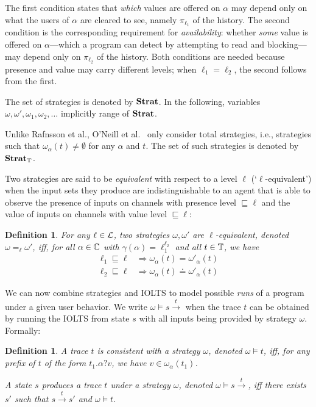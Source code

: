 \documentclass[preprint,5p,twocolumn]{elsarticle}
\newtheorem{definition}[theorem]{Definition}
\begin{document}
The first condition states that \emph{which} values are offered on $\alpha$ may depend only on
what the users of $\alpha$ are cleared to see, namely $\pi_{\ell_1}$ of the history. The second
condition is the corresponding requirement for \emph{availability}: whether \emph{some} value is
offered on $\alpha$---which a program can detect by attempting to read and blocking---may depend
only on $\pi_{\ell_2}$ of the history. Both conditions are needed because presence and value may
carry different levels; when $\ell_1 = \ell_2$, the second follows from the first.

The set of strategies is denoted by $\mathbf{Strat}$. In the following, variables $\omega, \omega', \omega_1, \omega_2, \dots$ implicitly range of $\mathbf{Strat}$.

Unlike Rafnsson et al., O'Neill et al.~\cite{ONeill2006} only consider total strategies, i.e.,
strategies such that $\omega_\alpha(t) \neq \emptyset$ for any $\alpha$ and $t$. The set of such strategies is denoted by $\mathbf{Strat}_{\mathrm{T}}$.

Two strategies are said to be \emph{equivalent} with respect to a level $\ell$ (`$\ell$-equivalent')
when the input sets they produce are indistinguishable to an agent that is able to observe
the presence of inputs on channels with presence level $\sqsubseteq \ell$ and the value of inputs
on channels with value level $\sqsubseteq \ell$:

\begin{definition}
  For any $\ell \in \mathcal{L}$, two strategies $\omega, \omega'$ are $\ell$-equivalent, denoted $\omega =_{\ell} \omega'$, iff, for all $\alpha \in \mathbb{C}$ with $\gamma(\alpha)=\ell_1^{\ell_2}$ and all $t \in \mathbb{T}$, we have
  \begin{align*}
    \ell_1 \sqsubseteq \ell &\Longrightarrow \omega_\alpha(t) = \omega'_\alpha (t) \\
    \ell_2 \sqsubseteq \ell &\Longrightarrow \omega_\alpha(t) \doteq \omega'_\alpha (t)
  \end{align*}
\end{definition}

We can now combine strategies and IOLTS to model possible \emph{runs} of a program under a
given user behavior. We write $\omega \models s \xrightarrow{t}$ when the trace $t$ can be
obtained by running the IOLTS from state $s$ with all inputs being provided by strategy $\omega$.
Formally:

\begin{definition}
  A trace $t$ is \emph{consistent} with a strategy $\omega$, denoted $\omega \models t$, iff, for any prefix of $t$
  of the form $t_1. \alpha ? v$, we have $v \in \omega_\alpha(t_1)$.

  A state $s$ \emph{produces a trace $t$ under a strategy $\omega$}, denoted $\omega \models s \xrightarrow{t}$, iff there exists $s'$ such that $s \xrightarrow{t} s'$ and $\omega \models t$.
\end{definition}
\end{document}
